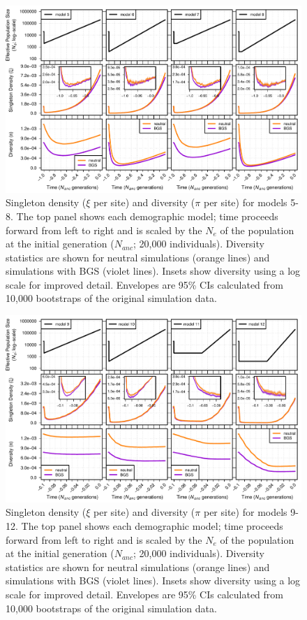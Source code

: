 \documentclass[9pt,twocolumn,twoside]{rilabRxiv}
\begin{document}
\begin{figure}[t]
\includegraphics[width=\linewidth]{figures/FigS4.pdf}
\caption{Singleton density ($\xi$ per site) and diversity ($\pi$ per site) for models 5-8.
The top panel shows each demographic model; time proceeds forward from left to right and is scaled by the $N_e$ of the population at the initial generation ($N_{anc}$; 20,000 individuals).
Diversity statistics are shown for neutral simulations (orange lines) and simulations with BGS (violet lines).
Insets show diversity using a log scale for improved detail.
Envelopes are 95\% CIs calculated from 10,000 bootstraps of the original simulation data.}
\label{fig:S4}
\end{figure}
\pagebreak

\begin{figure}[t]
\includegraphics[width=\linewidth]{figures/FigS5.pdf}
\caption{Singleton density ($\xi$ per site) and diversity ($\pi$ per site) for models 9-12.
The top panel shows each demographic model; time proceeds forward from left to right and is scaled by the $N_e$ of the population at the initial generation ($N_{anc}$; 20,000 individuals).
Diversity statistics are shown for neutral simulations (orange lines) and simulations with BGS (violet lines).
Insets show diversity using a log scale for improved detail.
Envelopes are 95\% CIs calculated from 10,000 bootstraps of the original simulation data.}
\label{fig:S5}
\end{figure}
\pagebreak
\end{document}
